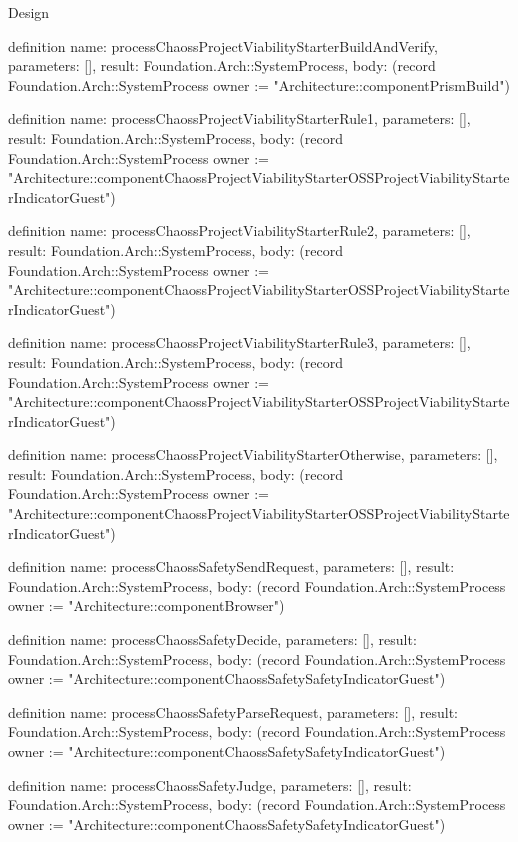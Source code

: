 \begin{lexlean}{Design}
\begin{semanticmodule}
definition{
  name: processChaossProjectViabilityStarterBuildAndVerify,
  parameters: [],
  result: Foundation.Arch::SystemProcess,
  body: (record Foundation.Arch::SystemProcess {owner := "Architecture::componentPrismBuild"})
}

definition{
  name: processChaossProjectViabilityStarterRule1,
  parameters: [],
  result: Foundation.Arch::SystemProcess,
  body: (record Foundation.Arch::SystemProcess {owner := "Architecture::componentChaossProjectViabilityStarterOSSProjectViabilityStarterIndicatorGuest"})
}

definition{
  name: processChaossProjectViabilityStarterRule2,
  parameters: [],
  result: Foundation.Arch::SystemProcess,
  body: (record Foundation.Arch::SystemProcess {owner := "Architecture::componentChaossProjectViabilityStarterOSSProjectViabilityStarterIndicatorGuest"})
}

definition{
  name: processChaossProjectViabilityStarterRule3,
  parameters: [],
  result: Foundation.Arch::SystemProcess,
  body: (record Foundation.Arch::SystemProcess {owner := "Architecture::componentChaossProjectViabilityStarterOSSProjectViabilityStarterIndicatorGuest"})
}

definition{
  name: processChaossProjectViabilityStarterOtherwise,
  parameters: [],
  result: Foundation.Arch::SystemProcess,
  body: (record Foundation.Arch::SystemProcess {owner := "Architecture::componentChaossProjectViabilityStarterOSSProjectViabilityStarterIndicatorGuest"})
}

definition{
  name: processChaossSafetySendRequest,
  parameters: [],
  result: Foundation.Arch::SystemProcess,
  body: (record Foundation.Arch::SystemProcess {owner := "Architecture::componentBrowser"})
}

definition{
  name: processChaossSafetyDecide,
  parameters: [],
  result: Foundation.Arch::SystemProcess,
  body: (record Foundation.Arch::SystemProcess {owner := "Architecture::componentChaossSafetySafetyIndicatorGuest"})
}

definition{
  name: processChaossSafetyParseRequest,
  parameters: [],
  result: Foundation.Arch::SystemProcess,
  body: (record Foundation.Arch::SystemProcess {owner := "Architecture::componentChaossSafetySafetyIndicatorGuest"})
}

definition{
  name: processChaossSafetyJudge,
  parameters: [],
  result: Foundation.Arch::SystemProcess,
  body: (record Foundation.Arch::SystemProcess {owner := "Architecture::componentChaossSafetySafetyIndicatorGuest"})
}


\end{semanticmodule}
\end{lexlean}

